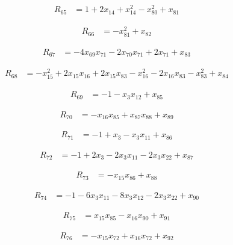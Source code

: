 \documentclass[11pt,letterpaper]{article}
\theoremstyle{definition}
\theoremstyle{remark}
\begin{document}
\begin{align*}
R_{65} &= 1 +2 x_{14} +x_{14}^{2} -x_{80}^{2} +x_{81}
\end{align*}

\begin{align*}
R_{66} &= -x_{81}^{2} +x_{82}
\end{align*}

\begin{align*}
R_{67} &= -4 x_{69} x_{71} -2 x_{70} x_{71} +2 x_{71} +x_{83}
\end{align*}

\begin{align*}
R_{68} &= -x_{15}^{2} +2 x_{15} x_{16} +2 x_{15} x_{83} -x_{16}^{2} -2 x_{16} x_{83} -x_{83}^{2} +x_{84}
\end{align*}

\begin{align*}
R_{69} &= -1 -x_{3} x_{12} +x_{85}
\end{align*}

\begin{align*}
R_{70} &= -x_{16} x_{85} +x_{87} x_{88} +x_{89}
\end{align*}

\begin{align*}
R_{71} &= -1 +x_{3} -x_{3} x_{11} +x_{86}
\end{align*}

\begin{align*}
R_{72} &= -1 +2 x_{3} -2 x_{3} x_{11} -2 x_{3} x_{22} +x_{87}
\end{align*}

\begin{align*}
R_{73} &= -x_{15} x_{86} +x_{88}
\end{align*}

\begin{align*}
R_{74} &= -1 -6 x_{3} x_{11} -8 x_{3} x_{12} -2 x_{3} x_{22} +x_{90}
\end{align*}

\begin{align*}
R_{75} &= x_{15} x_{85} -x_{16} x_{90} +x_{91}
\end{align*}

\begin{align*}
R_{76} &= -x_{15} x_{72} +x_{16} x_{72} +x_{92}
\end{align*}
\end{document}
